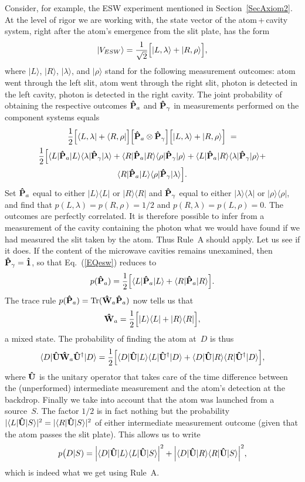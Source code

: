 \documentclass[12pt]{article}
\newcommand{\bra}[1]{\langle#1\vert}
\newcommand{\ket}[1]{\vert#1\rangle}
\newcommand{\ketbra}[2]{\vert#1\rangle\langle#2\vert}
\newcommand{\sandwich}[3]{\langle#1\vert#2\vert#3\rangle}
\newcommand{\Tr}{\hbox{Tr}}
\newcommand{\be}{\begin{equation}}
\newcommand{\ee}{\end{equation}}
\newcommand{\hI}{{\bf\hat 1}}
\newcommand{\hP}{{\bf\hat P}}
\newcommand{\hU}{{\bf\hat U}}
\newcommand{\hW}{{\bf\hat W}}
\begin{document}
Consider, for example, the ESW experiment mentioned in Section~\ref{SecAxiom2}. At the level of rigor we are working with, the state vector of the atom\,+\,cavity system, right after the atom's emergence from the slit plate, has the form
\be
\ket{V_{ESW}}=\frac1{\sqrt2}\Bigl[\ket{L,\lambda}+\ket{R,\rho}\Bigr],
\ee
where $\ket L$, $\ket R$, $\ket\lambda$, and $\ket\rho$ stand for the following measurement outcomes: atom went through the left slit, atom went through the right slit, photon is detected in the left cavity, photon is detected in the right cavity. The joint probability of obtaining the respective outcomes $\hP_a$ and $\hP_\gamma$ in measurements performed on the component systems equals
\begin{multline}
\label{EQesw}
\frac12\Bigl[\bra{L,\lambda}+\bra{R,\rho}\Bigr]\Bigl[\hP_a\otimes\hP_\gamma\Bigr]
\Bigl[\ket{L,\lambda}+\ket{R,\rho}\Bigr]\; =\\
\frac12\Bigl[\sandwich L{\hP_a}L\sandwich\lambda{\hP_\gamma}\lambda+
\sandwich R{\hP_a}R\sandwich\rho{\hP_\gamma}\rho+
\sandwich L{\hP_a}R\sandwich\lambda{\hP_\gamma}\rho+\\
\sandwich R{\hP_a}L\sandwich\rho{\hP_\gamma}\lambda\Bigr].
\end{multline}
Set $\hP_a$ equal to either $\ketbra LL$ or $\ketbra RR$ and $\hP_\gamma$ equal to either $\ketbra\lambda\lambda$ or $\ketbra\rho\rho$, and find that $p(L,\lambda)=p(R,\rho)=1/2$ and $p(R,\lambda)=p(L,\rho)=0$. The outcomes are perfectly correlated. It is therefore possible to infer from a measurement of the cavity containing the photon what we would have found if we had measured the slit taken by the atom. Thus Rule~A should apply. Let us see if it does. If the content of the microwave cavities remains unexamined, then $\hP_\gamma=\hI$, so that Eq.~(\ref{EQesw}) reduces to
\be
p(\hP_a)=\frac12\Bigl[\sandwich L{\hP_a}L+\sandwich R{\hP_a}R\Bigr].
\ee
The trace rule $p(\hP_a)=\Tr(\hW_a\hP_a)$ now tells us that
\be
\hW_a=\frac12\Bigl[\ketbra LL +\ketbra RR\Bigr],
\ee
a mixed state. The probability of finding the atom at~$D$ is thus
\be
\sandwich D{\hU\hW_a\hU^\dagger}D=\frac12\Bigl[\sandwich D\hU L\sandwich L{\hU^\dagger}D +\sandwich D\hU R\sandwich R{\hU^\dagger}D\Bigr],
\ee
where $\hU$ is the unitary operator that takes care of the time difference  between the (unperformed) intermediate measurement and the atom's detection at the backdrop. Finally we take into account that the atom was launched from a source~$S$. The factor $1/2$ is in fact nothing but the probability $|\sandwich L\hU S|^2=|\sandwich R\hU S|^2$ of either intermediate measurement outcome (given that the atom passes the slit plate). This allows us to write
\be
p\bigl(D|S)=\Bigl|\sandwich D\hU L\sandwich L\hU S\Bigr|^2+\Bigl|\sandwich D\hU R\sandwich R\hU S\Bigr|^2,
\ee
which is indeed what we get using Rule~A.
\end{document}

